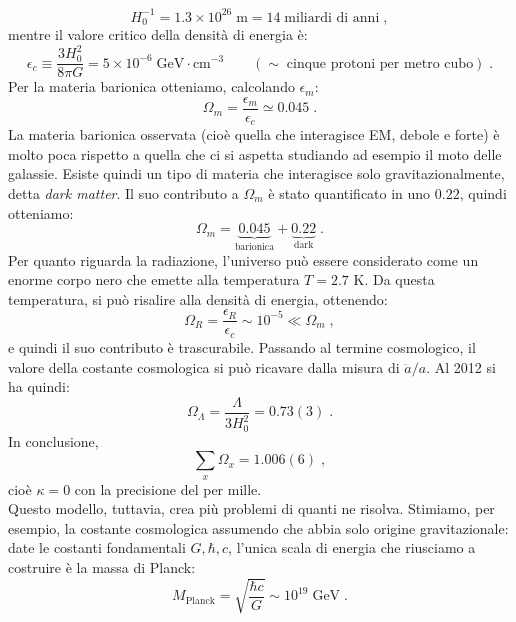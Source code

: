 \documentclass[12pt,a4paper]{report}
\theoremstyle{definition}
\begin{document}
\begin{equation}
H_0^{-1}=1.3\times 10^{26}\;\mathrm{m}=14\;\mbox{miliardi di anni}\;,
\end{equation}
mentre il valore critico della densità di energia è:
\begin{equation}
\epsilon_c\equiv \frac{3H_0^2}{8\pi G}=5\times 10^{-6}\;\mathrm{GeV}\cdot\mathrm{cm}^{-3}\qquad (\sim\;\mbox{cinque protoni per metro cubo})\;.
\end{equation}
Per la materia barionica otteniamo, calcolando $\epsilon_m$:
\begin{equation*}
\Omega_m=\frac{\epsilon_m}{\epsilon_c}\simeq 0.045\;.
\end{equation*}
La materia barionica osservata (cioè quella che interagisce EM, debole e forte) è molto poca rispetto a quella che ci si aspetta studiando ad esempio il moto delle galassie. Esiste quindi un tipo di materia che interagisce solo gravitazionalmente, detta \emph{dark matter}. Il suo contributo a $\Omega_m$ è stato quantificato in uno $0.22$, quindi otteniamo:
\begin{equation}
\Omega_m = \underbrace{0.045}_{\mbox{barionica}}+\underbrace{0.22}_{\mbox{dark}}\;.
\end{equation}
Per quanto riguarda la radiazione, l'universo può essere considerato come un enorme corpo nero che emette alla temperatura $T=2.7$ K. Da questa temperatura, si può risalire alla densità di energia, ottenendo:
\begin{equation}
\Omega_R=\frac{\epsilon_R}{\epsilon_c}\sim 10^{-5}\ll \Omega_m\;,
\end{equation}
e quindi il suo contributo è trascurabile. Passando al termine cosmologico, il valore della costante cosmologica si può ricavare dalla misura di $\ddot{a}/a$. Al 2012 si ha quindi:
\begin{equation}
\Omega_{\Lambda}=\frac{\Lambda}{3H_0^2}=0.73(3)\;.
\end{equation}
In conclusione,
\begin{equation}
\sum_x\Omega_x=1.006(6)\;,
\end{equation}
cioè $\kappa=0$ con la precisione del per mille. \\
Questo modello, tuttavia, crea più problemi di quanti ne risolva. Stimiamo, per esempio, la costante cosmologica assumendo che abbia solo origine gravitazionale: date le costanti fondamentali $G,\hbar,c$, l'unica scala di energia che riusciamo a costruire è la massa di Planck:
\begin{equation}
M_{\mathrm{Planck}}=\sqrt{\frac{\hbar c}{G}}\sim 10^{19}\;\mathrm{GeV}\;.
\end{equation}
\end{document}
